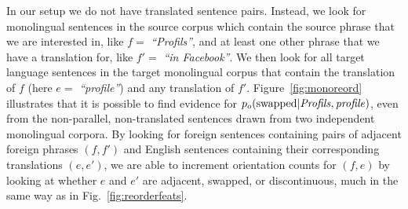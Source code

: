 \documentclass[11pt,letterpaper]{article}
\newcommand{\figref}[1]{Figure~\ref{#1}}
\newcommand{\emq}[1]{\emph{``#1''}}
\begin{document}
In our setup we do not have translated sentence pairs.  Instead, we look for monolingual sentences in the source corpus which contain the source phrase that we are interested in, like $f =$ \emq{Profils}, and at least one other phrase that we have a translation for, like $f' =$ \emq{in Facebook}.  We then look for all target language sentences in the target monolingual corpus that contain the translation of $f$ (here $e =$ \emq{profile}) and any translation of $f'$.  \figref{fig:monoreord} illustrates that it is possible to find evidence for $p_o(\textnormal{swapped}| \it{ Profils},\it{ profile})$, even from the non-parallel, non-translated sentences drawn from two independent monolingual corpora.  By looking for foreign sentences containing pairs of adjacent foreign phrases $(f, f')$ and English sentences containing their corresponding translations $(e, e')$, we are able to increment orientation counts for $(f, e)$ by looking at whether $e$ and $e'$ are adjacent, swapped, or discontinuous, much in the same way as in Fig.~\ref{fig:reorderfeats}.







\end{document}
